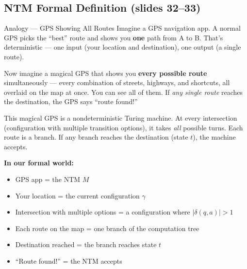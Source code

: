 \subsection{NTM Formal Definition (slides 32--33)}
\label{subsec:ntm-formal-def}

\begin{notebox}{Analogy --- GPS Showing All Routes}
Imagine a GPS navigation app. A normal GPS picks the ``best'' route and shows
you \textbf{one} path from A to B. That's deterministic --- one input (your
location and destination), one output (a single route).

Now imagine a magical GPS that shows you \textbf{every possible route}
simultaneously --- every combination of streets, highways, and shortcuts, all
overlaid on the map at once. You can see all of them. If \emph{any single route}
reaches the destination, the GPS says ``route found!''

This magical GPS is a nondeterministic Turing machine. At every intersection
(configuration with multiple transition options), it takes \emph{all} possible
turns. Each route is a branch. If any branch reaches the destination (state
$t$), the machine accepts.

\textbf{In our formal world:}
\begin{itemize}[nosep]
\item GPS app = the NTM $M$
\item Your location = the current configuration $\gamma$
\item Intersection with multiple options = a configuration where
  $|\delta(q, a)| > 1$
\item Each route on the map = one branch of the computation tree
\item Destination reached = the branch reaches state $t$
\item ``Route found!'' = the NTM accepts
\end{itemize}
\end{notebox}

